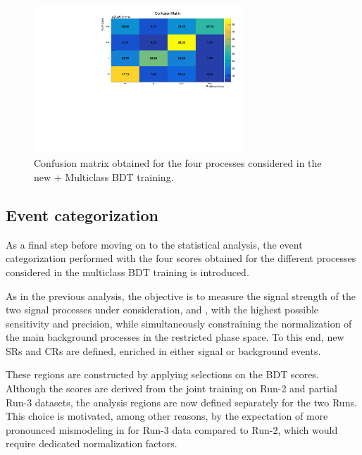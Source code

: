 \begin{figure}[htbp]
  \centering
  \includegraphics[width=0.7\textwidth]{images/plots_tH_tHqb_for_thesis/ConfusionMatrix.pdf}
    \caption{Confusion matrix obtained for the four processes considered in the new \thqb + \ttH Multiclass BDT training.}
    \label{confusion}
  \end{figure}
\subsection{Event categorization}
\label{new_categorization}

As a final step before moving on to the statistical analysis, the event categorization performed with the four scores obtained for the different processes considered in the multiclass BDT training is introduced.

As in the previous analysis, the objective is to measure the signal strength of the two signal processes under consideration, \thtt and \ttHtt, with the highest possible sensitivity and precision, while simultaneously constraining the normalization of the main background processes in the restricted phase space. To this end, new SRs and CRs are defined, enriched in either signal or background events.

These regions are constructed by applying selections on the BDT scores. Although the scores are derived from the joint training on Run-2 and partial Run-3 datasets, the analysis regions are now defined separately for the two Runs. This choice is motivated, among other reasons, by the expectation of more pronounced mismodeling in \ztautau for Run-3 data compared to Run-2, which would require dedicated normalization factors.

